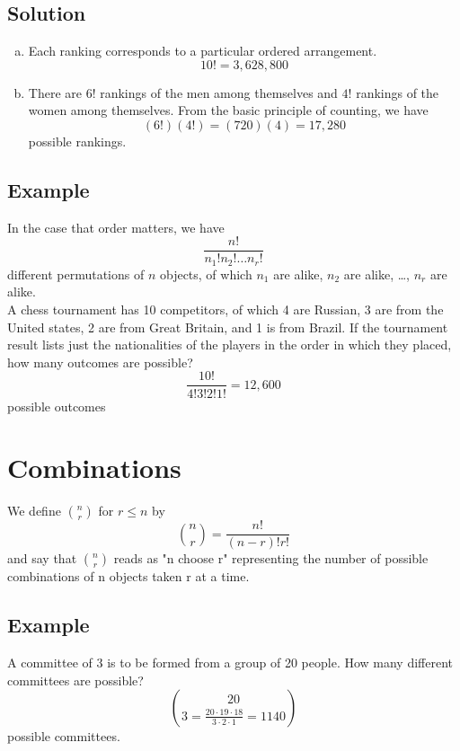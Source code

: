 \subsection*{Solution}
\begin{enumerate}[a. ]
    \item Each ranking corresponds to a particular ordered arrangement. \[10! = 3,628,800\]
    \item There are $6!$ rankings of the men among themselves and $4!$ rankings of the women among themselves. From the basic principle of counting, we have \[(6!)(4!) = (720)(4) = 17,280\] possible rankings.
\end{enumerate}
\subsection*{Example}
In the case that order matters, we have
\[\frac{n!}{n_1!n_2!\ldots n_r!}\]
different permutations of $n$ objects, of which $n_1$ are alike, $n_2$ are alike, \dots, $n_r$ are alike.\\
A chess tournament has 10 competitors, of which 4 are Russian, 3 are from the United states, 2 are from Great Britain, and 1 is from Brazil. If the tournament result lists just the nationalities of the players in the order in which they placed, how many outcomes are possible?
\[\frac{10!}{4!3!2!1!} = 12,600\] possible outcomes

\section{Combinations}
\begin{definition}[Combination]
We define $\binom{n}{r}$ for $r\leq n$ by \[{\binom{n}{r}} = \frac{n!}{(n-r)!r!}\]
and say that $\binom{n}{r}$ reads as "n choose r" representing the number of possible combinations of n objects taken r at a time.
\end{definition}
\subsection*{Example}
A committee of 3 is to be formed from a group of 20 people. How many different
committees are possible?
\[20\choose 3 = \frac{20\cdot 19\cdot 18}{3\cdot 2\cdot 1} = 1140\] possible committees.

